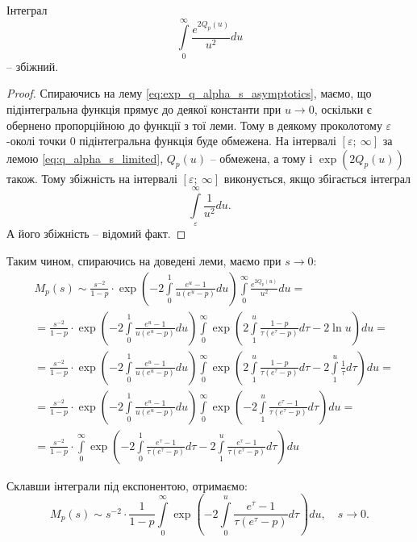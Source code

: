\begin{lem}
	Інтеграл
	$$
		\int\limits_0^\infty \frac{e^{2Q_p(u)}}{u^2} du
	$$
	– збіжний.
\end{lem}
\begin{proof}
	Спираючись на лему \eqref{eq:exp_q_alpha_s_asymptotics}, маємо, що підінтегральна функція прямує до деякої константи при $u \rightarrow 0$, оскільки є обернено пропорційною до функції з тої леми. Тому в деякому проколотому $\varepsilon$-околі точки 0 підінтегральна функція буде обмежена. На інтервалі $[\varepsilon; ~\infty]$ за лемою \eqref{eq:q_alpha_s_limited}, $Q_p(u)$ – обмежена, а тому і $\exp(2Q_p(u))$ також. Тому збіжність на інтервалі $[\varepsilon; ~\infty]$ виконується, якщо збігається інтеграл
	\[
		\int\limits_\varepsilon^\infty \frac{1}{u^2} du.
	\]
	А його збіжність – відомий факт.
\end{proof}
		
Таким чином, спираючись на доведені леми, маємо при $s \rightarrow 0$:
\begin{align*}
&M_p(s) \sim \frac{s^{-2}}{1-p} \cdot \exp\left(-2\int\limits_0^1 \frac{e^u  - 1}{u(e^u - p)} du\right) \int\limits_0^\infty \frac{e^{2Q_p(u)}}{u^2} du = \\
& = \frac{s^{-2}}{1-p} \cdot \exp\left(-2\int\limits_0^1 \frac{e^u  - 1}{u(e^u - p)} du\right) \int\limits_0^\infty \exp\left(2\int\limits_1^u \frac{1- p}{\tau(e^\tau - p)} d\tau - 2 \ln u\right) du = \\
& = \frac{s^{-2}}{1-p} \cdot \exp\left(-2\int\limits_0^1 \frac{e^u  - 1}{u(e^u - p)} du\right) \int\limits_0^\infty \exp\left(2\int\limits_1^u \frac{1- p}{\tau(e^\tau - p)} d\tau - 2  \int\limits_1^u  \frac{1}{\tau} d\tau \right) du = \\
& = \frac{s^{-2}}{1-p} \cdot \exp\left(-2\int\limits_0^1 \frac{e^u  - 1}{u(e^u - p)} du\right) \int\limits_0^\infty \exp\left(-2\int\limits_1^u \frac{e^{\tau} - 1}{\tau(e^\tau - p)} d\tau  \right) du = \\
& = \frac{s^{-2}}{1-p} \cdot \int\limits_0^\infty \exp\left( -2\int\limits_0^1 \frac{e^{\tau} - 1}{\tau(e^\tau - p)} d\tau -2\int\limits_1^u \frac{e^{\tau} - 1}{\tau(e^\tau - p)} d\tau  \right) du 
\end{align*}

Склавши інтеграли під експонентою, отримаємо:
\begin{equation}
	M_p(s) \sim s^{-2} \cdot \frac{1}{1-p} \int\limits_0^\infty \exp\left( -2\int\limits_0^u \frac{e^{\tau} - 1}{\tau(e^\tau - p)} d\tau  \right) du, \quad s \rightarrow 0.
\end{equation}

